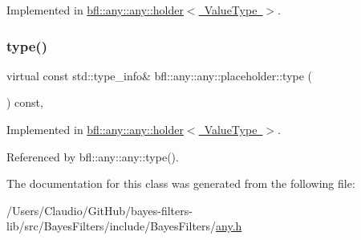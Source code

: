 Implemented in \mbox{\hyperlink{classbfl_1_1any_1_1any_1_1holder_aa291292df117432eeac1950b3a2677b3}{bfl\+::any\+::any\+::holder$<$ Value\+Type $>$}}.

\mbox{\label{classbfl_1_1any_1_1any_1_1placeholder_a3bbcdbccbceacccd08befecaade4e510}} 
\subsubsection{\texorpdfstring{type()}{type()}}
{\footnotesize\ttfamily virtual const std\+::type\+\_\+info\& bfl\+::any\+::any\+::placeholder\+::type (\begin{DoxyParamCaption}{ }\end{DoxyParamCaption}) const\hspace{0.3cm}{\ttfamily [pure virtual]}, {\ttfamily [noexcept]}}



Implemented in \mbox{\hyperlink{classbfl_1_1any_1_1any_1_1holder_a833f70296a6481da9f7d3e0e4d3120ae}{bfl\+::any\+::any\+::holder$<$ Value\+Type $>$}}.



Referenced by bfl\+::any\+::any\+::type().



The documentation for this class was generated from the following file\+:\begin{DoxyCompactItemize}
\item 
/\+Users/\+Claudio/\+Git\+Hub/bayes-\/filters-\/lib/src/\+Bayes\+Filters/include/\+Bayes\+Filters/\mbox{\hyperlink{any_8h}{any.\+h}}\end{DoxyCompactItemize}
